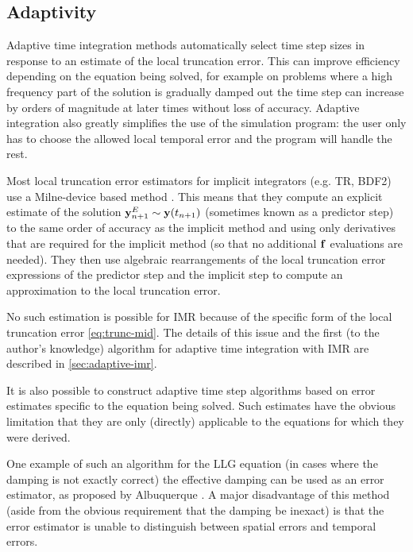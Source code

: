\subsection{Adaptivity}
\label{sec:adaptivity}

Adaptive time integration methods automatically select time step sizes in response to an estimate of the local truncation error.
This can improve efficiency depending on the equation being solved, for example on problems where a high frequency part of the solution is gradually damped out the time step can increase by orders of magnitude at later times without loss of accuracy.
Adaptive integration also greatly simplifies the use of the simulation program: the user only has to choose the allowed local temporal error and the program will handle the rest.

Most local truncation error estimators for implicit integrators (e.g. TR, BDF2) use a Milne-device based method \cite[707-716]{GreshoSani}.
This means that they compute an explicit estimate of the solution $\boldsymbol{\mathrm{y}}^E_{n+1} \sim \boldsymbol{\mathrm{y}}(t_{n+1})$  (sometimes known as a predictor step) to the same order of accuracy as the implicit method and using only derivatives that are required for the implicit method (so that no additional ${\boldsymbol{\mathrm{f}}}$ evaluations are needed).
They then use algebraic rearrangements of the local truncation error expressions of the predictor step and the implicit step to compute an approximation to the local truncation error.

No such estimation is possible for IMR because of the specific form of the local truncation error \eqref{eq:trunc-mid}.
The details of this issue and the first (to the author's knowledge) algorithm for adaptive time integration with IMR are described in \cref{sec:adaptive-imr}.

It is also possible to construct adaptive time step algorithms based on error estimates specific to the equation being solved.
Such estimates have the obvious limitation that they are only (directly) applicable to the equations for which they were derived.

One example of such an algorithm for the LLG equation (in cases where the damping is not exactly correct) the effective damping can be used as an error estimator, as proposed by Albuquerque \etal \cite{Albuquerque2001}.
A major disadvantage of this method (aside from the obvious requirement that the damping be inexact) is that the error estimator is unable to distinguish between spatial errors and temporal errors.

